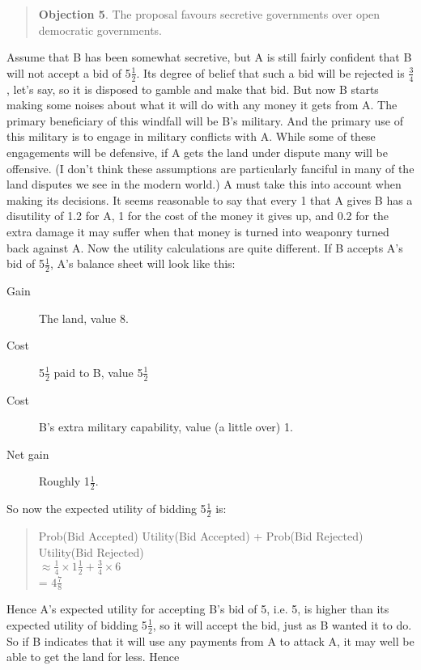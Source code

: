 \begin{quote}
\textbf{Objection 5}. The proposal favours secretive governments over open democratic governments.
\end{quote}

\noindent Assume that B has been somewhat secretive, but A is still fairly confident that B will not accept a bid of 5\(\frac{1}{2}\). Its degree of belief that such a bid will be rejected is \(\frac{3}{4}\), let's say, so it is disposed to gamble and make that bid. But now B starts making some noises about what it will do with any money it gets from A. The primary beneficiary of this windfall will be B's military. And the primary use of this military is to engage in military conflicts with A. While some of these engagements will be defensive, if A gets the land under dispute many will be offensive. (I don't think these assumptions are particularly fanciful in many of the land disputes we see in the modern world.) A must take this into account when making its decisions. It seems reasonable to say that every 1 that A gives B has a disutility of 1.2 for A, 1 for the cost of the money it gives up, and 0.2 for the extra damage it may suffer when that money is turned into weaponry turned back against A. Now the utility calculations are quite different. If B accepts A's bid of 5\(\frac{1}{2}\), A's balance sheet will look like this:

\begin{description}
\item[Gain] The land, value 8.
\item[Cost] 5\(\frac{1}{2}\) paid to B, value 5\(\frac{1}{2}\)
\item[Cost] B's extra military capability, value (a little over) 1.
\item[Net gain]Roughly 1\(\frac{1}{2}\).
\end{description}

\noindent So now the expected utility of bidding 5\(\frac{1}{2}\) is:

\begin{quote}
Prob(Bid Accepted) {\texttimes} Utility(Bid Accepted) +  Prob(Bid Rejected) {\texttimes} Utility(Bid Rejected) \\
\(\approx \frac{1}{4} \times 1\frac{1}{2} + \frac{3}{4} \times 6\) \\
= \(4\frac{7}{8}\)
\end{quote}

\noindent Hence A's expected utility for accepting B's bid of 5, i.e. 5, is higher than its expected utility of bidding 5\(\frac{1}{2}\), so it will accept the bid, just as B wanted it to do. So if B indicates that it will use any payments from A to attack A, it may well be able to get the land for less. Hence

